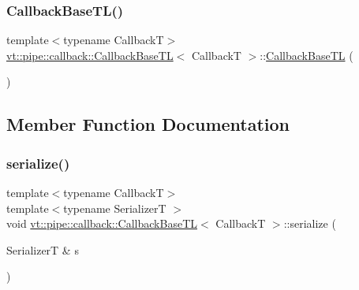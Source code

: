 \subsubsection{\texorpdfstring{Callback\+Base\+T\+L()}{CallbackBaseTL()}}
{\footnotesize\ttfamily template$<$typename CallbackT$>$ \\
\hyperlink{structvt_1_1pipe_1_1callback_1_1_callback_base_t_l}{vt\+::pipe\+::callback\+::\+Callback\+Base\+TL}$<$ CallbackT $>$\+::\hyperlink{structvt_1_1pipe_1_1callback_1_1_callback_base_t_l}{Callback\+Base\+TL} (\begin{DoxyParamCaption}{ }\end{DoxyParamCaption})\hspace{0.3cm}{\ttfamily [default]}}



\subsection{Member Function Documentation}
\mbox{\label{structvt_1_1pipe_1_1callback_1_1_callback_base_t_l_a5bb502d7c02bd253dc0517aa56743c71}} 
\subsubsection{\texorpdfstring{serialize()}{serialize()}}
{\footnotesize\ttfamily template$<$typename CallbackT$>$ \\
template$<$typename SerializerT $>$ \\
void \hyperlink{structvt_1_1pipe_1_1callback_1_1_callback_base_t_l}{vt\+::pipe\+::callback\+::\+Callback\+Base\+TL}$<$ CallbackT $>$\+::serialize (\begin{DoxyParamCaption}\item[{SerializerT \&}]{s }\end{DoxyParamCaption})\hspace{0.3cm}{\ttfamily [inline]}}

\mbox{\label{structvt_1_1pipe_1_1callback_1_1_callback_base_t_l_ac9deeadfe2d31c1f18051f1238f6c1d7}} 
